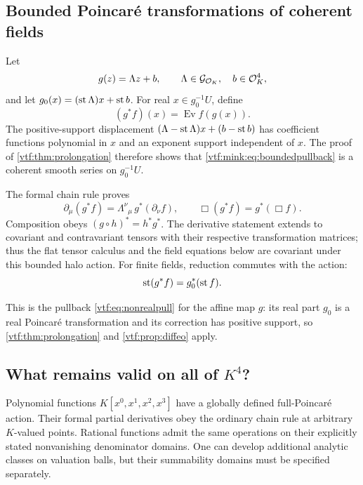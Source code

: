 \documentclass[11pt,letterpaper]{article}
\theoremstyle{definition}
\theoremstyle{remark}
\newcommand{\ev}{\operatorname{Ev}}\newcommand{\jet}{\operatorname{J}}
\begin{document}
\subsection{Bounded Poincar\'e transformations of coherent fields}
Let
\begin{equation}
 g(z)=\Lambda z+b,\qquad \Lambda\in \mathcal G_{\mathcal O_K},\quad b\in\mathcal O_K^4,
\end{equation}
and let $g_0(x)=(\operatorname{st}\Lambda)x+\operatorname{st} b$. For real $x\in g_0^{-1}U$, define
\begin{equation}\label{vtf:mink:eq:boundedpullback}
 (g^*f)(x)=\ev f(g(x)).
\end{equation}
The positive-support displacement
$(\Lambda-\operatorname{st}\Lambda)x+(b-\operatorname{st} b)$ has coefficient functions polynomial in $x$ and an exponent support independent of $x$. The proof of \cref{vtf:thm:prolongation} therefore shows that \cref{vtf:mink:eq:boundedpullback} is a coherent smooth series on $g_0^{-1}U$.

The formal chain rule proves
\begin{equation}
 \partial_\mu(g^*f)=\Lambda^\nu{}_\mu\,g^*(\partial_\nu f),
 \qquad \Box(g^*f)=g^*(\Box f).
\end{equation}
Composition obeys $(g\circ h)^*=h^*g^*$. The derivative statement extends to covariant and contravariant tensors with their respective transformation matrices; thus the flat tensor calculus and the field equations below are covariant under this bounded halo action. For finite fields, reduction commutes with the action:
\begin{equation}
 \operatorname{st}(g^*f)=g_0^*(\operatorname{st} f).
\end{equation}

This is the pullback \eqref{vtf:eq:nonrealpull} for the affine map $g$: its real
part $g_0$ is a real Poincar\'e transformation and its correction has positive
support, so \cref{vtf:thm:prolongation} and \cref{vtf:prop:diffeo} apply.

\subsection{What remains valid on all of \texorpdfstring{$K^4$}{K4}?}
Polynomial functions $K[x^0,x^1,x^2,x^3]$ have a globally defined full-Poincar\'e action. Their formal partial derivatives obey the ordinary chain rule at arbitrary $K$-valued points. Rational functions admit the same operations on their explicitly stated nonvanishing denominator domains. One can develop additional analytic classes on valuation balls, but their summability domains must be specified separately.
\end{document}
